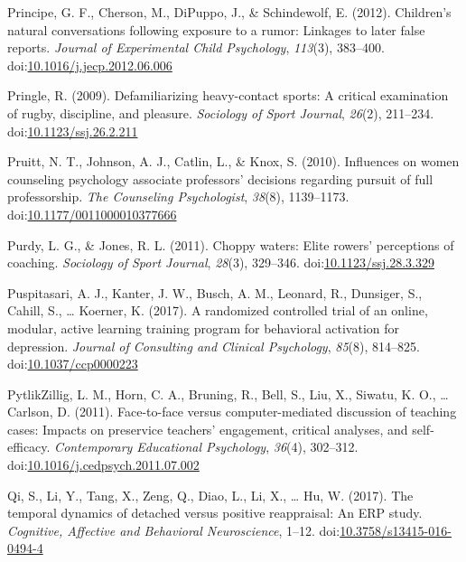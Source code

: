 \documentclass[english,man]{apa6}
\begin{document}
\hypertarget{ref-Principe2012}{}
Principe, G. F., Cherson, M., DiPuppo, J., \& Schindewolf, E. (2012).
Children's natural conversations following exposure to a rumor: Linkages
to later false reports. \emph{Journal of Experimental Child Psychology},
\emph{113}(3), 383--400.
doi:\href{https://doi.org/10.1016/j.jecp.2012.06.006}{10.1016/j.jecp.2012.06.006}

\hypertarget{ref-Pringle2009}{}
Pringle, R. (2009). Defamiliarizing heavy-contact sports: A critical
examination of rugby, discipline, and pleasure. \emph{Sociology of Sport
Journal}, \emph{26}(2), 211--234.
doi:\href{https://doi.org/10.1123/ssj.26.2.211}{10.1123/ssj.26.2.211}

\hypertarget{ref-Pruitt2010}{}
Pruitt, N. T., Johnson, A. J., Catlin, L., \& Knox, S. (2010).
Influences on women counseling psychology associate professors'
decisions regarding pursuit of full professorship. \emph{The Counseling
Psychologist}, \emph{38}(8), 1139--1173.
doi:\href{https://doi.org/10.1177/0011000010377666}{10.1177/0011000010377666}

\hypertarget{ref-Purdy2011}{}
Purdy, L. G., \& Jones, R. L. (2011). Choppy waters: Elite rowers'
perceptions of coaching. \emph{Sociology of Sport Journal},
\emph{28}(3), 329--346.
doi:\href{https://doi.org/10.1123/ssj.28.3.329}{10.1123/ssj.28.3.329}

\hypertarget{ref-Puspitasari2017a}{}
Puspitasari, A. J., Kanter, J. W., Busch, A. M., Leonard, R., Dunsiger,
S., Cahill, S., \ldots{} Koerner, K. (2017). A randomized controlled
trial of an online, modular, active learning training program for
behavioral activation for depression. \emph{Journal of Consulting and
Clinical Psychology}, \emph{85}(8), 814--825.
doi:\href{https://doi.org/10.1037/ccp0000223}{10.1037/ccp0000223}

\hypertarget{ref-PytlikZillig2011}{}
PytlikZillig, L. M., Horn, C. A., Bruning, R., Bell, S., Liu, X.,
Siwatu, K. O., \ldots{} Carlson, D. (2011). Face-to-face versus
computer-mediated discussion of teaching cases: Impacts on preservice
teachers' engagement, critical analyses, and self-efficacy.
\emph{Contemporary Educational Psychology}, \emph{36}(4), 302--312.
doi:\href{https://doi.org/10.1016/j.cedpsych.2011.07.002}{10.1016/j.cedpsych.2011.07.002}

\hypertarget{ref-Qi2017}{}
Qi, S., Li, Y., Tang, X., Zeng, Q., Diao, L., Li, X., \ldots{} Hu, W.
(2017). The temporal dynamics of detached versus positive reappraisal:
An ERP study. \emph{Cognitive, Affective and Behavioral Neuroscience},
1--12.
doi:\href{https://doi.org/10.3758/s13415-016-0494-4}{10.3758/s13415-016-0494-4}
\end{document}
